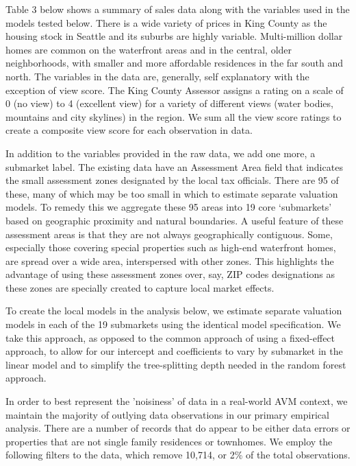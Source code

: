 \documentclass[colTwo]{anon}
\theoremstyle{definition}
\begin{document}
Table 3 below shows a summary of sales data along with the variables used in the models tested below. There is a wide variety of prices in King County as the housing stock in Seattle and its suburbs are highly variable.  Multi-million dollar homes are common on the waterfront areas and in the central, older neighborhoods, with smaller and more affordable residences in the far south and north.  The variables in the data are, generally, self explanatory with the exception of view score. The King County Assessor assigns a rating on a scale of 0 (no view) to 4 (excellent view) for a variety of different views (water bodies, mountains and city skylines) in the region. We sum all the view score ratings to create a composite view score for each observation in data.

In addition to the variables provided in the raw data, we add one more, a submarket label.  The existing data have an Assessment Area field that indicates the small assessment zones designated by the local tax officials.  There are 95 of these, many of which may be too small in which to estimate separate valuation models.  To remedy this we aggregate these 95 areas into 19 core ‘submarkets’ based on geographic proximity and natural boundaries. A useful feature of these assessment areas is that they are not always geographically contiguous.  Some, especially those covering special properties such as high-end waterfront homes, are spread over a wide area, interspersed with other zones.  This highlights the advantage of using these assessment zones over, say, ZIP codes designations as these zones are specially created to capture local market effects.

To create the local models in the analysis below, we estimate separate valuation models in each of the 19 submarkets using the identical model specification.  We take this approach, as opposed to the common approach of using a fixed-effect approach, to allow for our intercept and coefficients to vary by submarket in the linear model and to simplify the tree-splitting depth needed in the random forest approach.

In order to best represent the 'noisiness' of data in a real-world AVM context, we maintain the majority of outlying data observations in our primary empirical analysis. There are a number of records that do appear to be either data errors or properties that are not single family residences or townhomes.  We employ the following filters to the data, which remove 10,714, or 2\% of the total observations.
\end{document}

